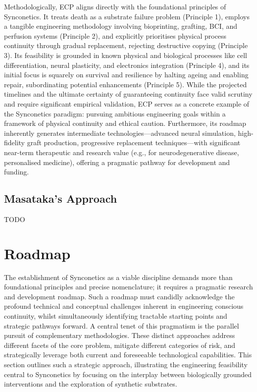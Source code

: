 \documentclass[10pt]{article}
\begin{document}
\begin{sloppypar}
  Methodologically, ECP aligns directly with the foundational principles of Synconetics. It treats death as a substrate failure problem (Principle 1), employs a tangible engineering methodology involving bioprinting, grafting, BCI, and perfusion systems (Principle 2), and explicitly prioritises physical process continuity through gradual replacement, rejecting destructive copying (Principle 3). Its feasibility is grounded in known physical and biological processes like cell differentiation, neural plasticity, and electronics integration (Principle 4), and its initial focus is squarely on survival and resilience by halting ageing and enabling repair, subordinating potential enhancements (Principle 5). While the projected timelines and the ultimate certainty of guaranteeing continuity face valid scrutiny and require significant empirical validation, ECP serves as a concrete example of the Synconetics paradigm: pursuing ambitious engineering goals within a framework of physical continuity and ethical caution. Furthermore, its roadmap inherently generates intermediate technologies—advanced neural simulation, high-fidelity graft production, progressive replacement techniques—with significant near-term therapeutic and research value (e.g., for neurodegenerative disease, personalised medicine), offering a pragmatic pathway for development and funding.

  \subsection{Masataka's Approach}
  \label{sec:masataka-approach}


  TODO


  \section{Roadmap}
  \label{sec:roadmap}

  The establishment of Synconetics as a viable discipline demands more than foundational principles and precise nomenclature; it requires a pragmatic research and development roadmap. Such a roadmap must candidly acknowledge the profound technical and conceptual challenges inherent in engineering conscious continuity, whilst simultaneously identifying tractable starting points and strategic pathways forward. A central tenet of this pragmatism is the parallel pursuit of complementary methodologies. These distinct approaches address different facets of the core problem, mitigate different categories of risk, and strategically leverage both current and foreseeable technological capabilities. This section outlines such a strategic approach, illustrating the engineering feasibility central to Synconetics by focusing on the interplay between biologically grounded interventions and the exploration of synthetic substrates.


\end{sloppypar}
\end{document}
